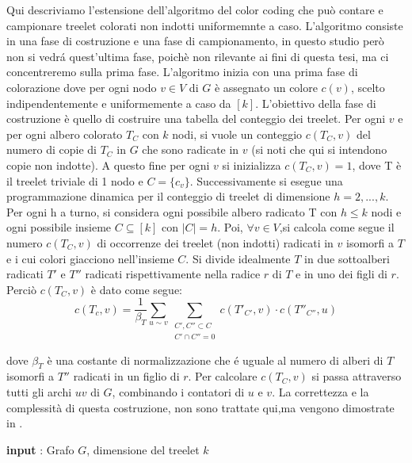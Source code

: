 Qui descriviamo l'estensione dell'algoritmo del color coding che pu\`o contare e campionare treelet colorati non indotti uniformemnte a caso.
L'algoritmo consiste in una fase di costruzione e una fase di campionamento, in questo studio per\`o non si vedr\'a quest'ultima fase, poich\`e non rilevante ai fini di questa tesi, ma ci concentreremo sulla prima fase.
L'algoritmo inizia con una prima fase di colorazione dove per ogni nodo $ v \in V $ di $ G $ \`e assegnato un colore $ c(v) $, scelto indipendentemente e uniformemente a caso da $ [k] $.
L'obiettivo della fase di costruzione \`e quello di costruire una tabella del conteggio dei treelet.
Per ogni $ v $ e per ogni albero colorato $ T_C $ con $ k $ nodi, si vuole un conteggio $ c(T_C , v) $ del numero di copie di $ T_C $  in $ G $ che sono radicate in $ v $ (si noti che qui si intendono copie non indotte).
A questo fine per ogni $ v $ si inizializza $ c(T_C , v) = 1 $, dove T \`e il treelet triviale di 1 nodo e $ C = \{c_v\} $.
Successivamente si esegue una programmazione dinamica per il conteggio di treelet di dimensione $ h = 2,...,k $.
Per ogni h a turno, si considera ogni possibile albero radicato T con $ h \le k $ nodi e ogni possibile insieme $ C \subseteq [k] $ con $ |C| = h $.
Poi, $ \forall v \in V $,si calcola come segue il numero $ c(T_C,v) $ di occorrenze dei treelet (non indotti) radicati in $ v $ isomorfi a $ T $ e i cui colori giacciono nell'insieme $ C $. Si divide idealmente $ T $ in due sottoalberi radicati $ T' $ e $ T'' $  radicati rispettivamente nella radice $ r $ di $ T $ e in uno dei figli di $ r $.\\
Perci\`o $ c(T_C,v) $ \`e dato come segue:
\begin{equation}\label{conta}
	c(T_c,v)=\frac{1}{\beta_T}\sum_{u\sim v}\sum_{\substack{{C',C''\subset C}\\{C'\cap C'' =0}}}c(T'_{C'},v)\cdot c(T''_{C''},u)
\end{equation}

dove $ \beta_T $ \`e una costante di normalizzazione che \'e uguale al numero di alberi di $ T $ isomorfi a $ T'' $ radicati in un figlio di $ r $. Per calcolare $ c(T_C,v) $ si passa attraverso tutti gli archi $ uv $ di $ G $, combinando i contatori di $ u $ e $ v $. La correttezza e la complessit\`a di questa costruzione, non sono trattate qui,ma vengono dimostrate in \cite{alon1995color}.

\begin{algorithm}[H]
	\SetAlgoLined
	\caption{Fase di costruzione}
	\textbf{input} : Grafo $ G $, dimensione del treelet $ k $ \;
\end{algorithm}





	
